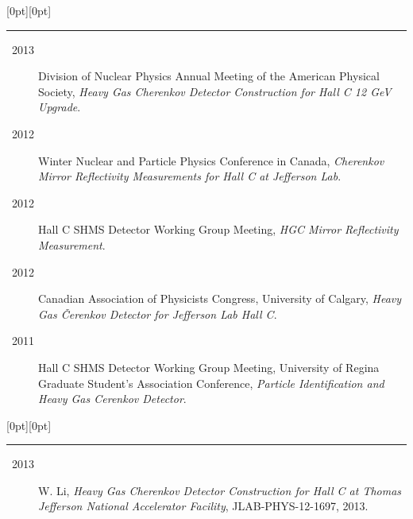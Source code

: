 \documentclass[letterpaper,12pt]{letter}
\begin{document}
\vspace{-8mm}
\raisebox{0pt}[0pt][0pt]{\large\textbf{\raisebox{-3.5ex}{Presentation}}} 
\\[2mm]
\rule[-0.3cm]{4cm}{1pt}



\begin{description}
\item[~2013] \textrm{\normalsize Division of Nuclear Physics Annual Meeting of the American Physical Society, \emph{Heavy Gas Cherenkov Detector Construction for Hall C 12 GeV Upgrade}. }
\item[~2012] \textrm{\normalsize Winter Nuclear and Particle Physics Conference in Canada, \emph{Cherenkov Mirror Reflectivity Measurements for Hall C at Jefferson Lab}. }
\item[~2012] \textrm{\normalsize Hall C SHMS Detector Working Group Meeting, \emph{HGC Mirror Reflectivity Measurement}. }
\item[~2012] \textrm{\normalsize Canadian Association of Physicists Congress, University of Calgary, \emph{Heavy Gas \v{C}erenkov Detector for Jefferson Lab Hall C}. }
\item[~2011] \textrm{\normalsize Hall C SHMS Detector Working Group Meeting, University of Regina Graduate Student's Association Conference, \emph{Particle Identification and Heavy Gas Cerenkov Detector}.}
\end{description}

\vspace{-8mm}
\raisebox{0pt}[0pt][0pt]{\large\textbf{\raisebox{-3.5ex}{Thesis}}} 
\\[2mm]
\rule[-0.3cm]{4cm}{1pt}

\begin{description}
\item[~2013] \textrm{\normalsize W. Li, \emph{ Heavy Gas Cherenkov Detector Construction for Hall C at Thomas Jefferson National Accelerator Facility}, JLAB-PHYS-12-1697, 2013. }
\end{description}


\secb

\end{document}
